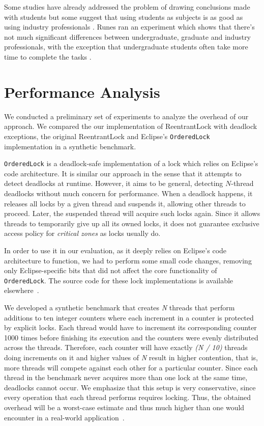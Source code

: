Some studies have already addressed the problem of drawing conclusions made with students but some suggest that using students as subjects is as good as using industry professionals \citep{staron}. Runes ran an experiment which shows that there's not much significant differences between undergraduate, graduate and industry professionals, with the exception that undergraduate students often take more time to complete the tasks \citep{runes}.

\section{Performance Analysis}\label{sec:perf}

We conducted a preliminary set of experiments to analyze the overhead of our approach.
We compared the our implementation of ReentrantLock with deadlock exceptions,
the original ReentrantLock and Eclipse's {\tt OrderedLock}~\citep{orderedlock} implementation in a synthetic benchmark.

{\tt OrderedLock} is a deadlock-safe implementation of a lock which relies on Eclipse's code architecture.
It is similar our approach in the sense that it attempts to detect deadlocks at runtime. However, it aims to be general, detecting $N$-thread deadlocks without much concern for performance.
When a deadlock happens, it releases all locks by a given thread and suspends it, allowing other threads to proceed.
Later, the suspended thread will acquire such locks again.
Since it allows threads to temporarily give up all its owned locks,
it does not guarantee exclusive access policy for \emph{critical zones} as locks usually do.

In order to use it in our evaluation, as it deeply relies on Eclipse's code architecture to function,
we had to perform some small code changes, removing only Eclipse-specific bits that did not affect the core functionality of {\tt OrderedLock}.
The source code for these lock implementations is available elsewhere~\citep{repo}.

We developed a synthetic benchmark that creates \emph{N} threads that perform additions to ten integer counters where each increment in a counter is protected by explicit locks.
Each thread would have to increment its corresponding counter 1000 times before finishing its execution and the counters were evenly distributed across the threads.
Therefore, each counter will have exactly \emph{(N / 10)} threads doing increments on it and higher values of \emph{N} result in higher contention,
that is, more threads will compete against each other for a particular counter.
Since each thread in the benchmark never acquires more than one lock at the same time, deadlocks cannot occur.
We emphasize that this setup is very conservative, since every operation that each thread performs requires locking.
Thus, the obtained overhead will be a worst-case estimate and thus much higher than one would encounter in a real-world application~\citep{lozi}.

